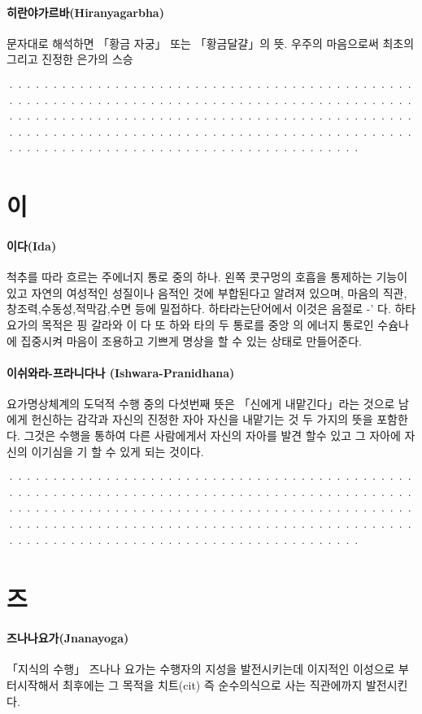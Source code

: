 \documentclass[12pt, a4paper, oneside]{book}
\let\stdsection\section
\renewcommand\section{\newpage\stdsection}
\begin{document}
\paragraph{히란야가르바(Hiranyagarbha)}
문자대로 해석하면 「황금 자궁」 또는 「황금달걀」의 뜻. 우주의 마음으로써 최초의 그리고 진정한 은가의 스승

································································································································································································································

\newpage
\section{이}

\paragraph{이다(Ida)}
척추를 따라 흐르는 주에너지 통로 중의 하나. 왼쪽 콧구멍의 호흡을 통제하는 기능이 있고 자연의 여성적인 성질이나 음적인 것에 부합된다고 알려져 있으며, 마음의 직관,창조력,수동성,적막감,수면 등에 밀접하다. 하타라는단어에서 이것은 음절로 -' 다. 하타 요가의 목적은 핑 갈라와 이 다 또 하와 타의 두 통로를 중앙 의 에너지 통로인 수슘나에 집중시켜 마음이 조용하고 기쁘게 명상을 할 수 있는 상태로 만들어준다.

\paragraph{이쉬와라-프라니다나 (Ishwara-Pranidhana)}
요가명상체계의 도덕적 수행 중의 다섯번째 뜻은 「신에게 내맡긴다」라는 것으로 남에게 헌신하는 감각과 자신의 진정한 자아 자신을 내맡기는 것 두 가지의 뜻을 포함한다. 그것은 수행을 통하여 다른 사람에게서 자신의 자아를 발견 할수 있고 그 자아에 자신의 이기심을 기 할 수 있게 되는 것이다.

································································································································································································································

\newpage
\section{즈}

\paragraph{즈나나요가(Jnanayoga)}
「지식의 수행」 즈나나 요가는 수행자의 지성을 발전시키는데 이지적인 이성으로 부터시작해서 최후에는 그 목적을 치트(cit) 즉 순수의식으로 사는 직관에까지 발전시킨다.
\end{document}
